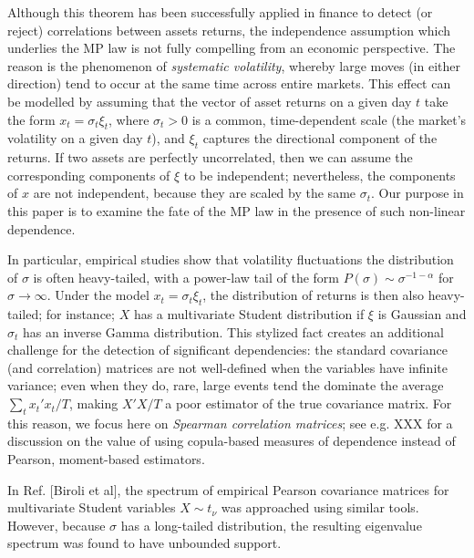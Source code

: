 \documentclass[
 prl,
 twocolumn,
 amsmath,
 amssymb,
 aps,
]{revtex4-2}
\begin{document}
Although this theorem has been successfully applied in finance to detect (or reject) correlations between assets returns, the independence assumption which underlies the MP law is not fully compelling from an economic perspective. 
The reason is the phenomenon of \emph{systematic volatility}, whereby large moves (in either direction) tend to occur at the same time across entire markets. 
This effect can be modelled by assuming that the vector of asset returns on a given day $t$ take the form $x_t = \sigma_t\xi_t$, where $\sigma_t > 0$ is a common, time-dependent scale (the market's volatility on a given day $t$), and $\xi_t$ captures the directional component of the returns. 
If two assets are perfectly uncorrelated, then we can assume the corresponding components of $\xi$ to be independent; nevertheless, the components of $x$ are not independent, because they are scaled by the same $\sigma_t$.
Our purpose in this paper is to examine the fate of the MP law in the presence of such non-linear dependence.  

In particular, empirical studies show that volatility fluctuations the distribution of $\sigma$ is often heavy-tailed, with a power-law tail of the form $P(\sigma) \sim \sigma^{-1-\alpha}$ for $\sigma\to\infty$.
Under the model $x_t = \sigma_t\xi_t$, the distribution of returns is then also heavy-tailed; for instance; $X$ has a multivariate Student distribution if $\xi$ is Gaussian and $\sigma_t$ has an inverse Gamma distribution. 
This stylized fact creates an additional challenge for the detection of significant dependencies: the standard covariance (and correlation) matrices are not well-defined when the variables have infinite variance; even when they do, rare, large events tend the dominate the average $\sum_t x_t' x_t/T$, making $X'X/T$ a poor estimator of the true covariance matrix.
For this reason, we focus here on \emph{Spearman correlation matrices}; see e.g. XXX for a discussion on the value of using copula-based measures of dependence instead of Pearson, moment-based estimators.   


In Ref. [Biroli et al], the spectrum of empirical Pearson covariance matrices for multivariate Student variables $X\sim t_\nu$ was approached using similar tools. 
However, because $\sigma$ has a long-tailed distribution, the resulting eigenvalue spectrum was found to have unbounded support. 
\end{document}
